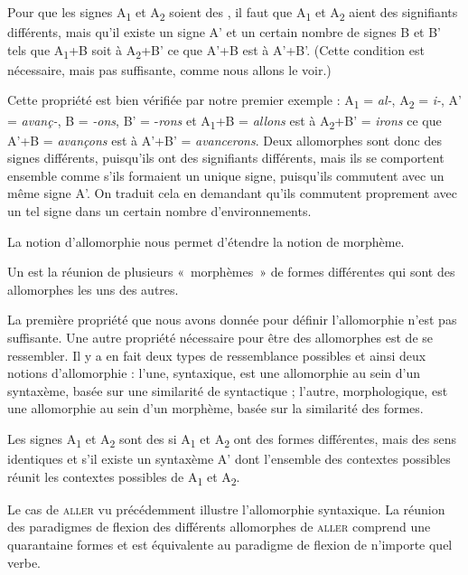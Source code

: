 {Pour que les signes A\textsubscript{1} et A\textsubscript{2} soient des , il faut que A\textsubscript{1} et A\textsubscript{2} aient des signifiants différents, mais qu’il existe un signe A’ et un certain nombre de signes B et B’ tels que A\textsubscript{1}+B soit à A\textsubscript{2}+B’ ce que A’+B est à A’+B’. (Cette condition est nécessaire, mais pas suffisante, comme nous allons le voir.)}

Cette propriété est bien vérifiée par notre premier exemple : A\textsubscript{1} = \textit{al-}, A\textsubscript{2} = \textit{i-}, A’ = \textit{avanç-}, B = \textit{{}-ons}, B’ = -\textit{rons} et A\textsubscript{1}+B = \textit{allons} est à A\textsubscript{2}+B’ = \textit{irons} ce que A’+B = \textit{avançons} est à A’+B’ = \textit{avancerons}. Deux allomorphes sont donc des signes différents, puisqu’ils ont des signifiants différents, mais ils se comportent ensemble comme s’ils formaient un unique signe, puisqu’ils commutent avec un même signe A’. On traduit cela en demandant qu’ils commutent proprement avec un tel signe dans un certain nombre d’environnements.

La notion d’allomorphie nous permet d’étendre la notion de morphème.

{Un  est la réunion de plusieurs «~morphèmes~» de formes différentes qui sont des allomorphes les uns des autres.}

La première propriété que nous avons donnée pour définir l’allomorphie n’est pas suffisante. Une autre propriété nécessaire pour être des allomorphes est de se ressembler. Il y a en fait deux types de ressemblance possibles et ainsi deux notions d’allomorphie : l’une, syntaxique, est une allomorphie au sein d’un syntaxème, basée sur une similarité de syntactique ; l’autre, morphologique, est une allomorphie au sein d’un morphème, basée sur la similarité des formes.%

{Les signes A\textsubscript{1} et A\textsubscript{2} sont des  si A\textsubscript{1} et A\textsubscript{2} ont des formes différentes, mais des sens identiques et s’il existe un syntaxème A’ dont l’ensemble des contextes possibles réunit les contextes possibles de A\textsubscript{1} et A\textsubscript{2}.}

\begin{sloppypar}
Le cas de \textsc{aller} vu précédemment illustre l’allomorphie syntaxique. La réunion des paradigmes de flexion des différents allomorphes de \textsc{aller} comprend une quarantaine formes et est équivalente au paradigme de flexion de n’importe quel verbe.
\end{sloppypar}

